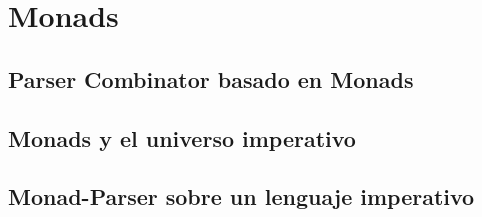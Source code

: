 
\chapter{Monads}

\section{Parser Combinator basado en Monads}

\section{Monads y el universo imperativo}

\section{Monad-Parser sobre un lenguaje imperativo}


